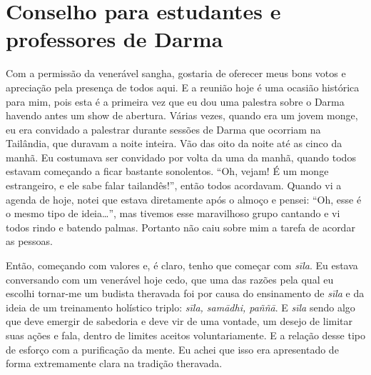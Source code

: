 
\chapter{Conselho para estudantes e professores de Darma}
\markright{\theChapterAuthor}

Com a permissão da venerável sangha, gostaria de oferecer meus bons
votos e apreciação pela presença de todos aqui. E a reunião hoje é uma
ocasião histórica para mim, pois esta é a primeira vez que eu dou uma
palestra sobre o Darma havendo antes um show de abertura. Várias vezes,
quando era um jovem monge, eu era convidado a palestrar durante sessões
de Darma que ocorriam na Tailândia, que duravam a noite inteira. Vão
das oito da noite até as cinco da manhã. Eu costumava ser convidado por
volta da uma da manhã, quando todos estavam começando a ficar bastante
sonolentos. “Oh, vejam! É um monge estrangeiro, e ele sabe falar
tailandês!”, então todos acordavam. Quando vi a agenda de hoje, notei
que estava diretamente após o almoço e pensei: “Oh, esse é o mesmo tipo
de ideia\ldots{}”, mas tivemos esse maravilhoso grupo cantando e vi todos
rindo e batendo palmas. Portanto não caiu sobre mim a tarefa de acordar
as pessoas. 

Então, começando com valores e, é claro, tenho que começar com
\textit{sīla}. Eu estava conversando com um venerável hoje cedo, que
uma das razões pela qual eu escolhi tornar-me um budista theravada foi
por causa do ensinamento de \textit{sīla} e da ideia de um
treinamento holístico triplo: \textit{sīla, samādhi, paññā}. E
\textit{sīla} sendo algo que deve emergir de sabedoria e deve vir de
uma vontade, um desejo de limitar suas ações e fala, dentro de limites
aceitos voluntariamente. E a relação desse tipo de esforço com a
purificação da mente. Eu achei que isso era apresentado de forma
extremamente clara na tradição theravada. 

